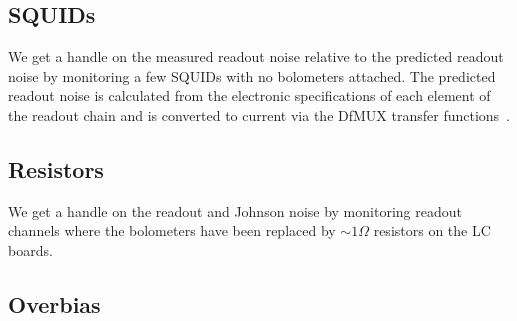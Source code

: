 \subsection{SQUIDs}
\label{sec:squid_noise}

We get a handle on the measured readout noise relative to the predicted readout noise by monitoring a few \ac{SQUID}s with no bolometers attached.
The predicted readout noise is calculated from the electronic specifications of each element of the readout chain and is converted to current via the \ac{DfMUX} transfer functions~\citep{aubin_thesis}. 


\subsection{Resistors}
\label{sec:resistor_noise}

We get a handle on the readout and Johnson noise by monitoring readout channels where the bolometers have been replaced by $\sim1\Omega$ resistors on the \ac{LC} boards. 


\subsection{Overbias}
\label{sec:overbias_noise}

